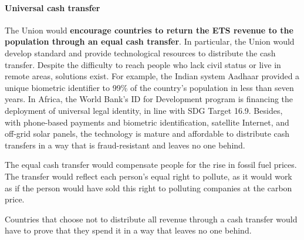 \documentclass[12pt,english]{article}
\begin{document}
\paragraph{Universal cash transfer} 
The Union would \textbf{encourage countries to return the ETS revenue to the population through an equal cash transfer}. In particular, the Union would develop standard and provide technological resources to distribute the cash transfer. Despite the difficulty to reach people who lack civil status or live in remote areas, solutions exist. For example, the Indian system Aadhaar provided a unique biometric identifier to 99\% of the country's population in less than seven years. In Africa, the World Bank's ID for Development program is financing the deployment of universal legal identity, in line with SDG Target 16.9. Besides, with phone-based payments and biometric identification, satellite Internet, and off-grid solar panels, the technology is mature and affordable to distribute cash transfers in a way that is fraud-resistant and leaves no one behind.

The equal cash transfer would compensate people for the rise in fossil fuel prices. The transfer would reflect each person's equal right to pollute, as it would work as if the person would have sold this right to polluting companies at the carbon price.

Countries that choose not to distribute all revenue through a cash transfer would have to prove that they spend it %
in a way that leaves no one behind.

\end{document}
